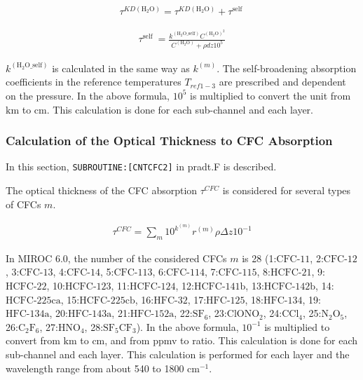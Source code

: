 \begin{eqnarray}
\tau^{K D\left(\mathrm{H_2O}\right)}=\tau^{K D\left(\mathrm{H_2O}\right)}+\tau^{\text {self }}
\end{eqnarray}

\begin{eqnarray}
\tau^{\text {self }}=\frac{k^{\left(\mathrm{H_2O\_self}\right)} C^{\left(\mathrm{H_2O}\right)^{2}}}{C^{\left(\mathrm{H_2O}\right)}+\rho d z 10^{5}}
\end{eqnarray}

\(k^{(\mathrm{H_2O\_self})}\) is calculated in the same way as \(k^{(m)}\). The self-broadening absorption coefficients in the reference temperatures \(T_{ref1-3}\) are prescribed and dependent on the
pressure. In the above formula, \(10^{5}\) is multiplied to convert the unit from \(\mathrm{km}\) to \(\mathrm{cm}\). This calculation is done for each sub-channel and each layer.

\hypertarget{calculation-of-the-optical-thickness-to-cfc-absorption}{%
\subsubsection{Calculation of the Optical Thickness to CFC Absorption}\label{calculation-of-the-optical-thickness-to-cfc-absorption}}

In this section, \texttt{SUBROUTINE:{[}CNTCFC2{]}} in pradt.F is described.

The optical thickness of the CFC absorption \(\tau^{CFC}\) is considered for several types of CFCs \(m\).

\begin{eqnarray}
\tau^{C F C}=\sum_{m} 10^{k^{(m)}} r^{(m)} \rho \Delta z 10^{-1}
\end{eqnarray}

In MIROC 6.0, the number of the considered CFCs \(m\) is 28 (1:\(\mathrm{CFC\text{-11}}\), 2:\(\mathrm{CFC\text{-12}}\), 3:\(\mathrm{CFC\text{-13}}\), 4:\(\mathrm{CFC\text{-14}}\),
5:\(\mathrm{CFC\text{-113}}\), 6:\(\mathrm{CFC\text{-114}}\), 7:\(\mathrm{CFC\text{-115}}\), 8:\(\mathrm{HCFC\text{-21}}\), 9:\(\mathrm{HCFC\text{-22}}\), 10:\(\mathrm{HCFC\text{-123}}\),
11:\(\mathrm{HCFC\text{-124}}\), 12:\(\mathrm{HCFC\text{-141b}}\), 13:\(\mathrm{HCFC\text{-142b}}\), 14:\(\mathrm{HCFC\text{-225ca}}\), 15:\(\mathrm{HCFC\text{-225cb}}\),
16:\(\mathrm{HFC\text{-32}}\), 17:\(\mathrm{HFC\text{-125}}\), 18:\(\mathrm{HFC\text{-134}}\), 19:\(\mathrm{HFC\text{-134a}}\), 20:\(\mathrm{HFC\text{-143a}}\), 21:\(\mathrm{HFC\text{-152a}}\),
22:\(\mathrm{SF_6}\), 23:\(\mathrm{ClONO_2}\), 24:\(\mathrm{CCl_4}\), 25:\(\mathrm{N_2O_5}\), 26:\(\mathrm{C_2F_6}\), 27:\(\mathrm{HNO_4}\), 28:\(\mathrm{SF_5CF_3}\)). In the above formula,
\(10^{-1}\) is multiplied to convert from \(\mathrm{km}\) to \(\mathrm{cm}\), and from ppmv to ratio. This calculation is done for each sub-channel and each layer. This calculation is performed for
each layer and the wavelength range from about 540 to 1800 \(\mathrm{cm}^{-1}\).

